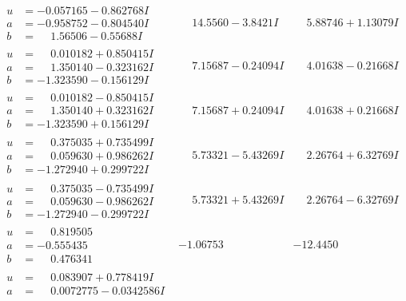 \documentclass[1p]{elsarticle_modified}
\theoremstyle{definition}
\begin{document}
$$\begin{array}{c|c|c}
\begin{aligned}
u &= -0.057165 - 0.862768 I \\
a &= -0.958752 - 0.804540 I \\
b &= \phantom{-}1.56506 - 0.55688 I\end{aligned}
 & \phantom{-}14.5560 - 3.8421 I & \phantom{-}5.88746 + 1.13079 I \\ \hline\begin{aligned}
u &= \phantom{-}0.010182 + 0.850415 I \\
a &= \phantom{-}1.350140 - 0.323162 I \\
b &= -1.323590 - 0.156129 I\end{aligned}
 & \phantom{-}7.15687 - 0.24094 I & \phantom{-}4.01638 - 0.21668 I \\ \hline\begin{aligned}
u &= \phantom{-}0.010182 - 0.850415 I \\
a &= \phantom{-}1.350140 + 0.323162 I \\
b &= -1.323590 + 0.156129 I\end{aligned}
 & \phantom{-}7.15687 + 0.24094 I & \phantom{-}4.01638 + 0.21668 I \\ \hline\begin{aligned}
u &= \phantom{-}0.375035 + 0.735499 I \\
a &= \phantom{-}0.059630 + 0.986262 I \\
b &= -1.272940 + 0.299722 I\end{aligned}
 & \phantom{-}5.73321 - 5.43269 I & \phantom{-}2.26764 + 6.32769 I \\ \hline\begin{aligned}
u &= \phantom{-}0.375035 - 0.735499 I \\
a &= \phantom{-}0.059630 - 0.986262 I \\
b &= -1.272940 - 0.299722 I\end{aligned}
 & \phantom{-}5.73321 + 5.43269 I & \phantom{-}2.26764 - 6.32769 I \\ \hline\begin{aligned}
u &= \phantom{-}0.819505\phantom{ +0.000000I} \\
a &= -0.555435\phantom{ +0.000000I} \\
b &= \phantom{-}0.476341\phantom{ +0.000000I}\end{aligned}
 & -1.06753\phantom{ +0.000000I} & -12.4450\phantom{ +0.000000I} \\ \hline\begin{aligned}
u &= \phantom{-}0.083907 + 0.778419 I \\
a &= \phantom{-}0.0072775 - 0.0342586 I \\

\end{aligned}
\end{array}$$
\end{document}
